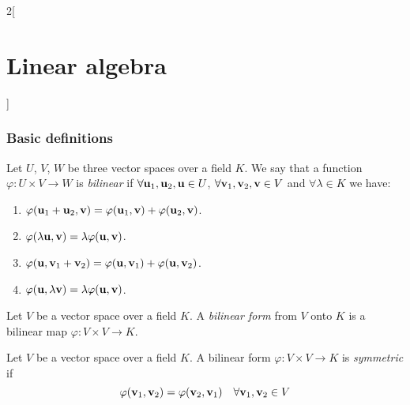 \documentclass[../../../main.tex]{subfiles}
\begin{document}
\begin{multicols}{2}[\section{Linear algebra}]
  \subsubsection{Basic definitions}
  \begin{definition}
    Let $U$, $V$, $W$ be three vector spaces over a field $K$. We say that a function $\varphi:U\times V\rightarrow W$ is \emph{bilinear} if $\forall\boldsymbol{\mathrm{u}}_1,\boldsymbol{\mathrm{u}}_2,\boldsymbol{\mathrm{u}}\in U$, $\forall \boldsymbol{\mathrm{v}}_1,\boldsymbol{\mathrm{v}}_2,\boldsymbol{\mathrm{v}}\in V$ and $\forall\lambda\in K$ we have:
    \begin{enumerate}
      \item $\varphi(\boldsymbol{\mathrm{u}}_1+\boldsymbol{\mathrm{u}}_2,\boldsymbol{\mathrm{v}})=\varphi(\boldsymbol{\mathrm{u}}_1,\boldsymbol{\mathrm{v}})+\varphi(\boldsymbol{\mathrm{u}}_2,\boldsymbol{\mathrm{v}})$.
      \item $\varphi(\lambda \boldsymbol{\mathrm{u}},\boldsymbol{\mathrm{v}})=\lambda \varphi(\boldsymbol{\mathrm{u}},\boldsymbol{\mathrm{v}})$.
      \item $\varphi(\boldsymbol{\mathrm{u}},\boldsymbol{\mathrm{v}}_1+\boldsymbol{\mathrm{v}}_2)=\varphi(\boldsymbol{\mathrm{u}},\boldsymbol{\mathrm{v}}_1)+\varphi(\boldsymbol{\mathrm{u}},\boldsymbol{\mathrm{v}}_2)$.
      \item $\varphi(\boldsymbol{\mathrm{u}},\lambda \boldsymbol{\mathrm{v}})=\lambda \varphi(\boldsymbol{\mathrm{u}},\boldsymbol{\mathrm{v}})$.
    \end{enumerate}
  \end{definition}
  \begin{definition}
    Let $V$ be a vector space over a field $K$. A \emph{bilinear form} from $V$ onto $K$ is a bilinear map $\varphi:V\times V\rightarrow K$.
  \end{definition}
  \begin{definition}
    Let $V$ be a vector space over a field $K$. A bilinear form $\varphi:V\times V\rightarrow K$ is \emph{symmetric} if $$\varphi(\boldsymbol{\mathrm{v}}_1,\boldsymbol{\mathrm{v}}_2)=\varphi(\boldsymbol{\mathrm{v}}_2,\boldsymbol{\mathrm{v}}_1)\quad\forall \boldsymbol{\mathrm{v}}_1,\boldsymbol{\mathrm{v}}_2\in V$$
  \end{definition}

\end{multicols}
\end{document}
